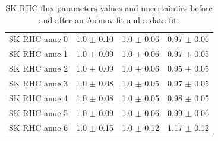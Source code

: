 \begin{table}[ht!]
\begin{tabular}{llll}
    \Gls{SK} \Gls{RHC} \Gls{anue} 0& 1.0 $\pm$ 0.10 & 1.0 $\pm$ 0.06 & 0.97 $\pm$ 0.06 \\ 
    \Gls{SK} \Gls{RHC} \Gls{anue} 1& 1.0 $\pm$ 0.09 & 1.0 $\pm$ 0.06 & 0.97 $\pm$ 0.05 \\ 
    \Gls{SK} \Gls{RHC} \Gls{anue} 2& 1.0 $\pm$ 0.09 & 1.0 $\pm$ 0.06 & 0.95 $\pm$ 0.05 \\ 
    \Gls{SK} \Gls{RHC} \Gls{anue} 3& 1.0 $\pm$ 0.08 & 1.0 $\pm$ 0.05 & 0.97 $\pm$ 0.05 \\ 
    \Gls{SK} \Gls{RHC} \Gls{anue} 4& 1.0 $\pm$ 0.08 & 1.0 $\pm$ 0.05 & 0.98 $\pm$ 0.05 \\ 
    \Gls{SK} \Gls{RHC} \Gls{anue} 5& 1.0 $\pm$ 0.09 & 1.0 $\pm$ 0.06 & 0.99 $\pm$ 0.06 \\ 
    \Gls{SK} \Gls{RHC} \Gls{anue} 6& 1.0 $\pm$ 0.15 & 1.0 $\pm$ 0.12 & 1.17 $\pm$ 0.12 \\
    \bottomrule
  \end{tabular}
  \caption{\Gls{SK} \Gls{RHC} flux parameters values and uncertainties
    before and after an \Gls{Asimov} fit and a data fit.}
\end{table}




